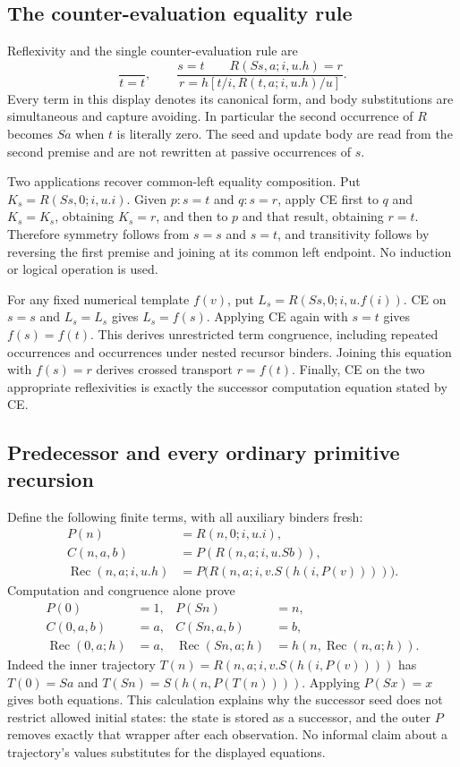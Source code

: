 \subsection{The counter-evaluation equality rule}

Reflexivity and the single counter-evaluation rule are
\[
 \frac{}{t=t},\qquad
 \frac{s=t\qquad R(Ss,a;i,u.h)=r}
      {r=h[t/i,R(t,a;i,u.h)/u]}.
\tag{CE}
\]
Every term in this display denotes its canonical form, and body substitutions
are simultaneous and capture avoiding. In particular the second occurrence
of $R$ becomes $Sa$ when $t$ is literally zero. The seed and update body
are read from the second premise and are not rewritten at passive occurrences
of $s$.

Two applications recover common-left equality composition. Put
$K_s=R(Ss,0;i,u.i)$. Given $p:s=t$ and $q:s=r$, apply CE first to $q$
and $K_s=K_s$, obtaining $K_s=r$, and then to $p$ and that result,
obtaining $r=t$. Therefore symmetry follows from $s=s$ and $s=t$,
and transitivity follows by reversing the first premise and joining at its
common left endpoint. No induction or logical operation is used.

For any fixed numerical template $f(v)$, put
$L_s=R(Ss,0;i,u.f(i))$. CE on $s=s$ and $L_s=L_s$ gives
$L_s=f(s)$. Applying CE again with $s=t$ gives $f(s)=f(t)$.
This derives unrestricted term congruence, including repeated occurrences
and occurrences under nested recursor binders. Joining this equation with
$f(s)=r$ derives crossed transport $r=f(t)$. Finally, CE on the two
appropriate reflexivities is exactly the successor computation equation stated by CE.

\subsection{Predecessor and every ordinary primitive recursion}

Define the following finite terms, with all auxiliary binders fresh:
\[
\begin{aligned}
 P(n)&=R(n,0;i,u.i),\\
 C(n,a,b)&=P(R(n,a;i,u.Sb)),\\
 \operatorname{Rec}(n,a;i,u.h)
   &=P\bigl(R(n,a;i,v.S(h(i,P(v))))\bigr).
\end{aligned}
\]
Computation and congruence alone prove
\[
\begin{aligned}
 P(0)&=1,& P(Sn)&=n,\\
 C(0,a,b)&=a,& C(Sn,a,b)&=b,\\
 \operatorname{Rec}(0,a;h)&=a,&
 \operatorname{Rec}(Sn,a;h)&=h(n,\operatorname{Rec}(n,a;h)).
\end{aligned}
\tag{Compiler equations}
\]
Indeed the inner trajectory
$T(n)=R(n,a;i,v.S(h(i,P(v))))$ has $T(0)=Sa$ and
$T(Sn)=S(h(n,P(T(n))))$. Applying $P(Sx)=x$ gives both equations.
This calculation explains why the successor seed does not restrict allowed
initial states: the state is stored as a successor, and the outer $P$
removes exactly that wrapper after each observation. No informal claim
about a trajectory's values substitutes for the displayed equations.

